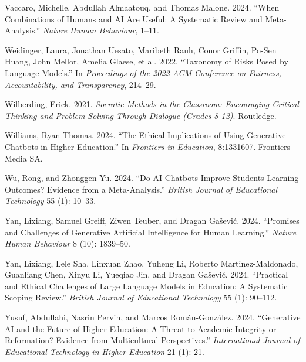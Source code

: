 \documentclass[
  11pt,
]{article}
\newlength{\cslhangindent}
\newenvironment{CSLReferences}[2] %
 {\begin{list}{}{%
  \setlength{\itemindent}{0pt}
  \setlength{\leftmargin}{0pt}
  \setlength{\parsep}{0pt}
  \ifodd #1
   \setlength{\leftmargin}{\cslhangindent}
   \setlength{\itemindent}{-1\cslhangindent}
  \fi
  \setlength{\itemsep}{#2\baselineskip}}}
 {\end{list}}
\begin{document}
\begin{CSLReferences}{1}{0}
Vaccaro, Michelle, Abdullah Almaatouq, and Thomas Malone. 2024. {``When Combinations of Humans and AI Are Useful: A Systematic Review and Meta-Analysis.''} \emph{Nature Human Behaviour}, 1--11.

Weidinger, Laura, Jonathan Uesato, Maribeth Rauh, Conor Griffin, Po-Sen Huang, John Mellor, Amelia Glaese, et al. 2022. {``Taxonomy of Risks Posed by Language Models.''} In \emph{Proceedings of the 2022 ACM Conference on Fairness, Accountability, and Transparency}, 214--29.

Wilberding, Erick. 2021. \emph{Socratic Methods in the Classroom: Encouraging Critical Thinking and Problem Solving Through Dialogue (Grades 8-12)}. Routledge.

Williams, Ryan Thomas. 2024. {``The Ethical Implications of Using Generative Chatbots in Higher Education.''} In \emph{Frontiers in Education}, 8:1331607. Frontiers Media SA.

Wu, Rong, and Zhonggen Yu. 2024. {``Do AI Chatbots Improve Students Learning Outcomes? Evidence from a Meta-Analysis.''} \emph{British Journal of Educational Technology} 55 (1): 10--33.

Yan, Lixiang, Samuel Greiff, Ziwen Teuber, and Dragan Gašević. 2024. {``Promises and Challenges of Generative Artificial Intelligence for Human Learning.''} \emph{Nature Human Behaviour} 8 (10): 1839--50.

Yan, Lixiang, Lele Sha, Linxuan Zhao, Yuheng Li, Roberto Martinez-Maldonado, Guanliang Chen, Xinyu Li, Yueqiao Jin, and Dragan Gašević. 2024. {``Practical and Ethical Challenges of Large Language Models in Education: A Systematic Scoping Review.''} \emph{British Journal of Educational Technology} 55 (1): 90--112.

Yusuf, Abdullahi, Nasrin Pervin, and Marcos Román-González. 2024. {``Generative AI and the Future of Higher Education: A Threat to Academic Integrity or Reformation? Evidence from Multicultural Perspectives.''} \emph{International Journal of Educational Technology in Higher Education} 21 (1): 21.

\end{CSLReferences}
\end{document}
